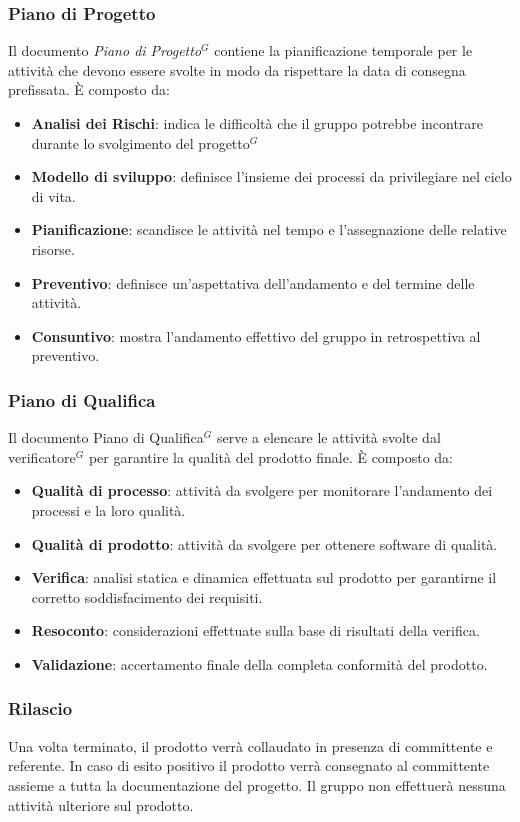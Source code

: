\documentclass[a4paper,10pt]{article}
\begin{document}
\subsubsection{Piano di Progetto}
Il documento \textit{Piano di Progetto$^G$} contiene la pianificazione temporale per le attività che devono essere svolte 
in modo da rispettare la data di consegna prefissata. È composto da:
\begin{itemize}
    \item \textbf{Analisi dei Rischi}: indica le difficoltà che il gruppo potrebbe incontrare durante lo svolgimento del progetto$^G$
    \item \textbf{Modello di sviluppo}: definisce l'insieme dei processi da privilegiare nel ciclo di vita.
    \item \textbf{Pianificazione}: scandisce le attività nel tempo e l'assegnazione delle relative risorse.
    \item \textbf{Preventivo}: definisce un'aspettativa dell'andamento e del termine delle attività.
    \item \textbf{Consuntivo}: mostra l'andamento effettivo del gruppo in retrospettiva al preventivo.
\end{itemize}
\subsubsection{Piano di Qualifica}
Il documento Piano di Qualifica$^G$ serve a elencare le attività svolte dal verificatore$^G$ per garantire la qualità
del prodotto finale. È composto da:
\begin{itemize}
    \item \textbf{Qualità di processo}: attività da svolgere per monitorare l'andamento dei processi e la loro qualità.
    \item \textbf{Qualità di prodotto}: attività da svolgere per ottenere software di qualità.
    \item \textbf{Verifica}: analisi statica e dinamica effettuata sul prodotto per garantirne il corretto soddisfacimento dei requisiti.
    \item \textbf{Resoconto}: considerazioni effettuate sulla base di risultati della verifica.
    \item \textbf{Validazione}: accertamento finale della completa conformità del prodotto. 
\end{itemize}
\subsubsection{Rilascio}
Una volta terminato, il prodotto verrà collaudato in presenza di committente e referente. 
In caso di esito positivo il prodotto verrà consegnato al committente assieme a tutta la documentazione del progetto.
Il gruppo non effettuerà nessuna attività ulteriore sul prodotto.
\end{document}
